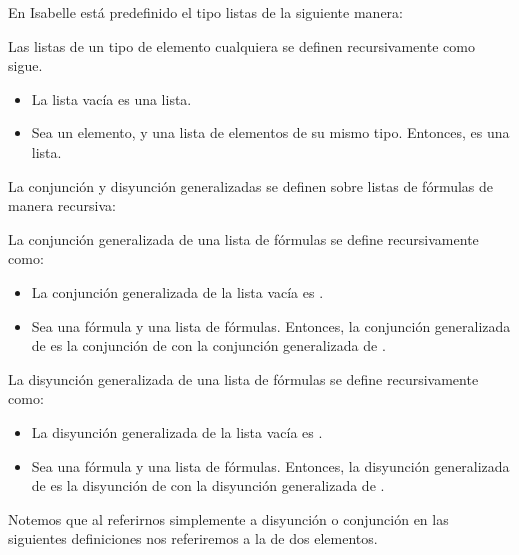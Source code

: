 \begin{isabellebody}
\begin{isamarkuptext}
  En Isabelle está predefinido el tipo listas de la siguiente manera:

  \begin{definicion}
    Las listas de un tipo de elemento cualquiera se definen
    recursivamente como sigue.
    \begin{itemize}
      \item[] La lista vacía es una lista.
      \item[] Sea  un elemento, y  una lista de elementos de su
      mismo tipo. Entonces,  es una lista.
    \end{itemize}
  \end{definicion}

  La conjunción y disyunción generalizadas se definen sobre listas de
  fórmulas de manera recursiva:

  \begin{definicion}
  La conjunción generalizada de una lista de fórmulas se define 
  recursivamente como:
    \begin{itemize}
      \item La conjunción generalizada de la lista vacía es \isa{{\isasymnot}{\isasymbottom}}.
      \item Sea  una fórmula y  una lista de fórmulas. Entonces,
  la conjunción generalizada de  es la conjunción de  con la 
  conjunción generalizada de .
    \end{itemize}
  \end{definicion}

  \begin{definicion}
  La disyunción generalizada de una lista de fórmulas se define 
  recursivamente como:
    \begin{itemize}
      \item La disyunción generalizada de la lista vacía es \isa{{\isasymbottom}}.
      \item Sea  una fórmula y  una lista de fórmulas. Entonces,
  la disyunción generalizada de  es la disyunción de  con la 
  disyunción generalizada de .
    \end{itemize}
  \end{definicion}

  Notemos que al referirnos simplemente a disyunción o conjunción en las
  siguientes definiciones nos referiremos a la de dos elementos.


\end{isamarkuptext}
\end{isabellebody}
